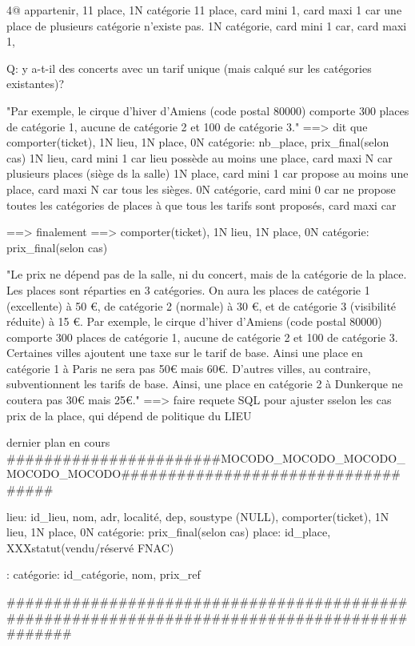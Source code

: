 \documentclass[12pt,a4paper]{article}
\begin{document}
{4@ appartenir, 11 place, 1N catégorie
11 place, card mini 1, card maxi 1 car une place de plusieurs catégorie n'existe pas.
1N catégorie, card mini 1 car, card maxi 1, 

Q: y a-t-il des concerts avec un tarif unique (mais calqué sur les catégories existantes)?




"Par exemple, le cirque d'hiver d'Amiens (code postal 80000) comporte 300 places de catégorie 1, aucune de catégorie 2 et 100 de catégorie 3."
==> dit que comporter(ticket), 1N lieu, 1N place, 0N catégorie: nb_place, prix_final(selon cas)
1N lieu, card mini 1 car lieu possède au moins une place, card maxi N car plusieurs places (siège ds la salle)
1N place, card mini 1 car propose au moins une place, card maxi N car tous les sièges.
0N catégorie, card mini 0 car ne propose toutes les catégories de places à  que tous les tarifs sont proposés, card maxi car

==> finalement 
==> comporter(ticket), 1N lieu, 1N place, 0N catégorie: prix_final(selon cas)



"Le prix ne dépend pas de la salle, ni du concert, mais de la catégorie de la place. Les places sont réparties en 3 catégories. On aura les places de catégorie 1 (excellente) à 50 €, de catégorie 2 (normale) à 30 €, et de catégorie 3 (visibilité réduite) à 15 €. Par exemple, le cirque d'hiver d'Amiens (code postal 80000) comporte 300 places de catégorie 1, aucune de catégorie 2 et 100 de catégorie 3.
Certaines villes ajoutent une taxe sur le tarif de base. Ainsi une place en catégorie 1 à Paris ne sera pas 50€ mais 60€. D’autres villes, au contraire, subventionnent les tarifs de base. Ainsi, une place en catégorie 2 à Dunkerque ne coutera pas 30€ mais 25€."
==> faire requete SQL pour ajuster sselon les cas prix de la place, qui dépend de politique du LIEU



dernier plan en cours
#######################MOCODO_MOCODO_MOCODO_MOCODO_MOCODO###################################


lieu: id_lieu, nom, adr, localité, dep, soustype (NULL),
comporter(ticket), 1N lieu, 1N place, 0N catégorie: prix_final(selon cas)
place: id_place, XXXstatut(vendu/réservé FNAC)

:
catégorie: id_catégorie, nom, prix_ref

#############################################################################################








}
\end{document}
